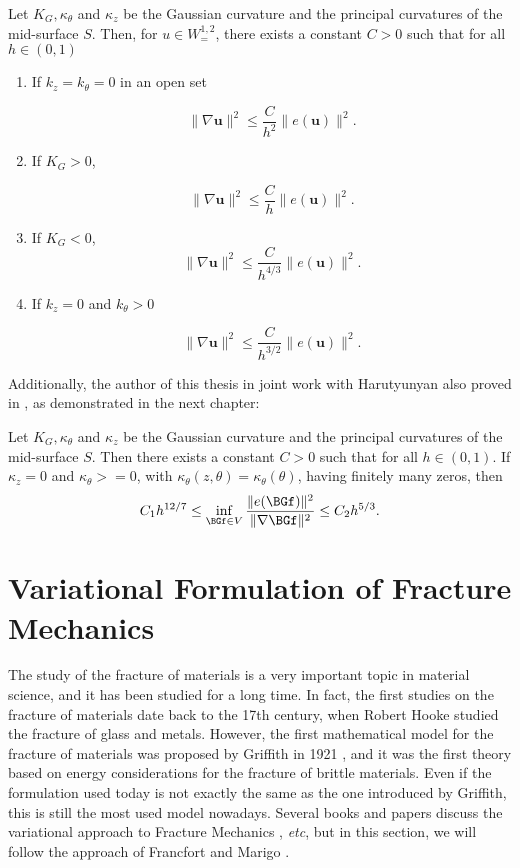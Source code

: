 \begin{theorem}
    Let $K_{G},\kappa_{\theta}$ and $\kappa_{z}$ be the Gaussian curvature and the principal curvatures of the mid-surface $S$. Then, for $u\in W_=^{1,2}$, there exists a constant $C>0$ such that for all $h \in(0,1)$
    \begin{enumerate}
    \item If $k_z=k_\theta=0$ in an open set

    { $$
        \|\nabla \boldsymbol{u}\|^{2} \leq \frac{C}{h^2}\|e(\boldsymbol{u})\|^{2}.$$}
       
    \item If $K_{G}>0$, 

    { $$\|\nabla \boldsymbol{u}\|^{2} \leq \frac{C}{h}\|e(\boldsymbol{u})\|^{2}.$$}

    \item If $K_{G}<0$,
    { $$
    \|\nabla \boldsymbol{u}\|^{2} \leq \frac{C}{h^{4 / 3}}\|e(\boldsymbol{u})\|^{2}.$$}
    
    \item If $k_z=0$ and $k_\theta>0$
     
    {
    $$
    \|\nabla \boldsymbol{u}\|^{2} \leq \frac{C}{h^{3/2}}\|e(\boldsymbol{u})\|^{2}.$$}
    \end{enumerate}
    \end{theorem}
Additionally, the author of this thesis in joint work with Harutyunyan also proved in \cite{andre}, as demonstrated in the next chapter:
\begin{theorem}
    Let $K_{G},\kappa_{\theta}$ and $\kappa_{z}$ be the Gaussian curvature and the principal curvatures of the mid-surface $S$. Then there exists a constant $C>0$ such that for all $h \in(0,1)$. If $\kappa_z=0$ and $\kappa_\theta>=0$, with $\kappa_\theta(z,\theta)=\kappa_\theta(\theta)$, having finitely many zeros, then
    $$C_1h^{12/7}\leq \inf_{\BGf\in V}\frac{\|e(\BGf)\|^2}{\|\nabla \BGf\|^2}\leq C_2h^{5/3}.$$
\end{theorem}

\section{ Variational Formulation of Fracture Mechanics}

\label{sec:fracture}
The study of the fracture of materials is a very important topic in material science, and it has been studied for a long time. In fact, the first studies on the fracture of materials date back to the 17th century, when Robert Hooke studied the fracture of glass and metals. However, the first mathematical model for the fracture of materials was proposed by Griffith in 1921 \cite{FracGrif}, and it was the first theory based on energy considerations for the fracture of brittle materials. Even if the formulation used today is not exactly the same as the one introduced by Griffith, this is still the most used model nowadays. Several books and papers discuss the variational approach to Fracture Mechanics \cite{FracBook, Frac2, Frac3}, \textit{etc}, but in this section, we will follow the approach of Francfort and Marigo \cite{Frac1}. 

